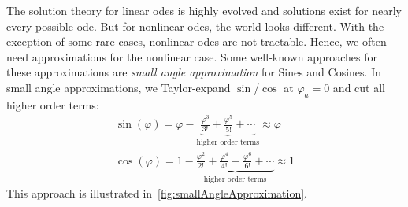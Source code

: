 	The solution theory for linear \acp{ode} is highly evolved and solutions exist for nearly every possible \ac{ode}. But for nonlinear \acp{ode}, the world looks different. With the exception of some rare cases, nonlinear \acp{ode} are not tractable. Hence, we often need approximations for the nonlinear case. Some well-known approaches for these approximations are \eg \emph{small angle approximation} for Sines and Cosines. In small angle approximations, we Taylor-expand \( \sin \)/\( \cos \) at \( \varphi_a = 0 \) and cut all higher order terms:
	\begin{gather*}
		\sin(\varphi) = \varphi - \underbrace{\frac{\varphi^3}{3!} + \frac{\varphi^5}{5!} + \cdots}_\text{higher order terms} \approx \varphi \\
		\cos(\varphi) = 1 - \underbrace{\frac{\varphi^2}{2!} + \frac{\varphi^4}{4!} - \frac{\varphi^6}{6!} + \cdots}_\text{higher order terms} \approx 1
	\end{gather*}
	This approach is illustrated in~\autoref{fig:smallAngleApproximation}.

